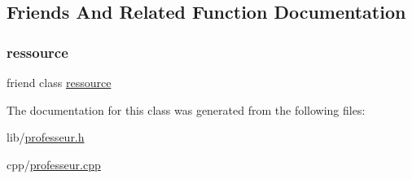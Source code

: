 \subsection{Friends And Related Function Documentation}
\hypertarget{classprofesseur_a24d55629351652ce27831ce9ef5194c9}{}\label{classprofesseur_a24d55629351652ce27831ce9ef5194c9} 
\subsubsection{\texorpdfstring{ressource}{ressource}}
{\footnotesize\ttfamily friend class \hyperlink{classressource}{ressource}\hspace{0.3cm}{\ttfamily [friend]}}



The documentation for this class was generated from the following files\+:\begin{DoxyCompactItemize}
\item 
lib/\hyperlink{professeur_8h}{professeur.\+h}\item 
cpp/\hyperlink{professeur_8cpp}{professeur.\+cpp}\end{DoxyCompactItemize}
